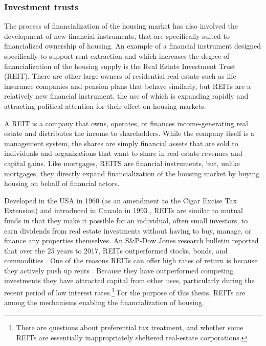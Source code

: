 \subsubsection{Investment trusts}

The process of financialization of the housing market has also involved the development of new financial instruments, that are specifically suited to financialized ownership of housing. An example of a financial instrument designed specifically to support rent extraction and which increases the degree of financialization of the housing supply is the Real Estate Investment Trust (\gls{REIT}). There are other large owners of residential real estate such as life insurance companies and pension plans that behave similarly, but REITs are a relatively new financial instrument, the use of which is expanding rapidly and attracting political attention for their effect on housing markets.

A REIT is a company that owns, operates, or finances income-generating real estate and distributes the income to shareholders. While the company itself is a management system, the shares are simply financial assets that are sold to individuals and organizations that want to share in real estate revenues and capital gains. Like mortgages, REITS are financial instruments, but, unlike mortgages, they directly expand financialization of the housing market by buying housing on behalf of financial actors.

Developed in the USA  in 1960 (as an amendment to the Cigar Excise Tax Extension) and introduced in Canada in 1993 \cite{GET_REITsDevelopedDates}, REITs are similar to mutual funds in that they make it possible for an individual, often small investors, to earn dividends from real estate investments without having to buy, manage, or finance any properties themselves. 
An S\&P-Dow Jones research bulletin reported that over the 25 years to 2017, REITs outperformed stocks, bonds, and commodities \cite{GET-Dow-Jones-research-bulletin}. One of the reasons REITs can offer high rates of return is because they actively push up rents%
\cite{GET-Martine-August, farhaReportFinancializationHousing2017}. 
 Because they have outperformed competing investments they have attracted capital from other uses, particularly during the recent period of low interest rates.\footnote{There are questions about preferential tax treatment, and whether some REITs are essentially inappropriately sheltered real-estate corporations.} For the purpose of this thesis, REITs are among the mechanisms enabling the financialization of housing.

